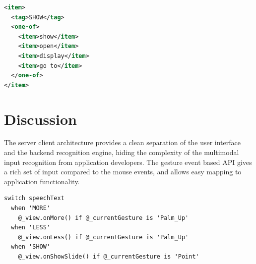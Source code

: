 \begin{lstlisting}[caption={An example of grammar definition in XML.},
language=XML, label={lst:grammar}] 
<item>
  <tag>SHOW</tag>
  <one-of>
    <item>show</item>
    <item>open</item>
    <item>display</item>
    <item>go to</item>
  </one-of>
</item>
\end{lstlisting}

\section{Discussion}
The server client architecture provides a clean separation of the user
interface and the backend recognition engine, hiding the complexity of the
multimodal input recognition from application developers. The gesture event
based API gives a rich set of input compared to the mouse events, and allows
easy mapping to application functionality.

\begin{lstlisting}[caption={Code for speech events.}, label={lst:speech-code}]
switch speechText
  when 'MORE'
    @_view.onMore() if @_currentGesture is 'Palm_Up'
  when 'LESS'
    @_view.onLess() if @_currentGesture is 'Palm_Up'
  when 'SHOW'
    @_view.onShowSlide() if @_currentGesture is 'Point'
\end{lstlisting}

